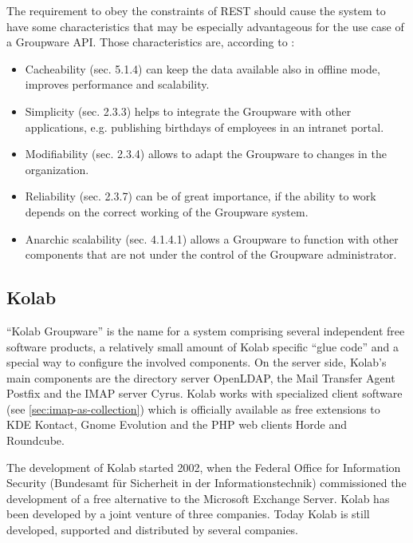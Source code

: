 \documentclass[12pt,a4paper,twoside]{scrartcl}		%
\begin{document}

The requirement to obey the constraints of REST should cause the system to have
some characteristics that may be especially advantageous for the use case of a
Groupware API. Those characteristics are, according to \cite{Fielding2000}:

\begin{itemize}
\item Cacheability (sec. 5.1.4) can keep the data available also in offline
  mode, improves performance and scalability.
\item Simplicity (sec. 2.3.3) helps to integrate the Groupware with other
  applications, e.g. publishing birthdays of employees in an intranet portal.
\item Modifiability (sec. 2.3.4) allows to adapt the Groupware to changes in the
  organization.
\item Reliability (sec. 2.3.7) can be of great importance, if the ability to
  work depends on the correct working of the Groupware system.
\item Anarchic scalability (sec. 4.1.4.1) allows a Groupware to function with
  other components that are not under the control of the Groupware
  administrator.
\end{itemize}


\subsection{Kolab}
\label{sec:kolab}

``Kolab Groupware'' is the name for a system comprising several independent free
software products, a relatively small amount of Kolab specific ``glue code'' and
a special way to configure the involved components. On the server side, Kolab's
main components are the directory server OpenLDAP, the Mail Transfer Agent
Postfix and the IMAP server Cyrus. Kolab works with specialized client software
(see \autoref{sec:imap-as-collection}) which is officially available as free
extensions to KDE Kontact, Gnome Evolution and the PHP web clients Horde and
Roundcube.

The development of Kolab started 2002, when the Federal Office for Information
Security (Bundesamt für Sicherheit in der Informationstechnik) commissioned the
development of a free alternative to the Microsoft Exchange Server. Kolab has
been developed by a joint venture of three companies\cite{Stoermer2004}. Today
Kolab is still developed, supported and distributed by several companies.
\end{document}
